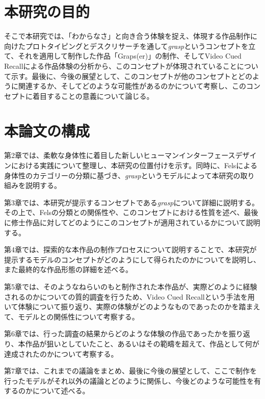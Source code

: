 \section{本研究の目的}
そこで本研究では、「わからなさ」と向き合う体験を捉え、体現する作品制作に向けたプロトタイピングとデスクリサーチを通して\textit{grasp}というコンセプトを立て、それを適用して制作した作品「Graps(er)」の制作、そしてVideo Cued Recallによる作品体験の分析から、このコンセプトが体現されていることについて示す。最後に、今後の展望として、このコンセプトが他のコンセプトとどのように関連するか、そしてどのような可能性があるのかについて考察し、このコンセプトに着目することの意義について論じる。

\section{本論文の構成}
第2章では、柔軟な身体性に着目した新しいヒューマンインターフェースデザインにおける実践について整理し、本研究の位置付けを示す。同時に、Felsによる身体性のカテゴリーの分類に基づき、\textit{grasp}というモデルによって本研究の取り組みを説明する。

第3章では、本研究が提示するコンセプトである\textit{grasp}について詳細に説明する。その上で、Felsの分類との関係性や、このコンセプトにおける性質を述べ、最後に修士作品に対してどのようにこのコンセプトが適用されているかについて説明する。

第4章では、探索的な本作品の制作プロセスについて説明することで、本研究が提示するモデルのコンセプトがどのようにして得られたのかについてを説明し、また最終的な作品形態の詳細を述べる。

第5章では、そのようなねらいのもと制作された本作品が、実際どのように経験されるのかについての質的調査を行うため、Video Cued Recallという手法を用いて体験について振り返り、実際の体験がどのようなものであったのかを踏まえて、モデルとの関係性について考察する。

第6章では、行った調査の結果からどのような体験の作品であったかを振り返り、本作品が狙いとしていたこと、あるいはその範疇を超えて、作品として何が達成されたのかについて考察する。

第7章では、これまでの議論をまとめ、最後に今後の展望として、ここで制作を行ったモデルがそれ以外の議論とどのように関係し、今後どのような可能性を有するのかについて述べる。